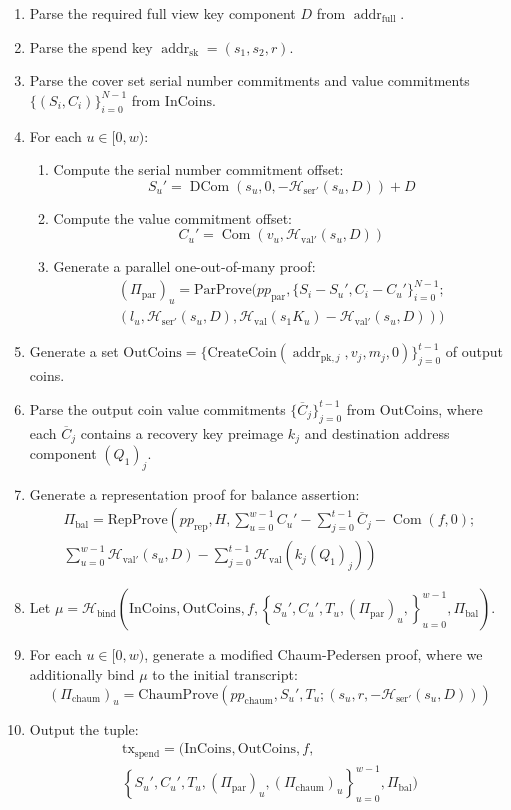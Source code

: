 \documentclass{llncs}
\newcommand{\hash}{\mathcal{H}}
\newcommand{\addr}{\operatorname{addr}}
\newcommand{\com}{\operatorname{Com}}
\newcommand{\dcom}{\operatorname{DCom}}
\begin{document}
\begin{enumerate}
    \item Parse the required full view key component $D$ from $\addr_{\text{full}}$.
    \item Parse the spend key $\addr_{\text{sk}} = (s_1, s_2, r)$.
    \item Parse the cover set serial number commitments and value commitments $\{(S_i, C_i)\}_{i=0}^{N-1}$ from $\text{InCoins}$.
    \item For each $u \in [0,w)$:
    \begin{enumerate}
        \item Compute the serial number commitment offset: $$S_u' = \dcom(s_u, 0, -\hash_{\text{ser}'}(s_u, D)) + D$$
        \item Compute the value commitment offset: $$C_u' = \com(v_u, \hash_{\text{val}'}(s_u, D))$$
        \item Generate a parallel one-out-of-many proof:
        \begin{multline*}
        (\Pi_{\text{par}})_u = \text{ParProve}(pp_{\text{par}},\{S_i - S_u', C_i - C_u'\}_{i=0}^{N-1}; \\
        (l_u, \hash_{\text{ser}'}(s_u, D), \hash_{\text{val}}(s_1 K_u) - \hash_{\text{val}'}(s_u, D)))
        \end{multline*}
    \end{enumerate}
    \item Generate a set $\text{OutCoins} = \{\text{CreateCoin}(\addr_{\text{pk},j}, v_j, m_j, 0)\}_{j=0}^{t-1}$ of output coins.
    \item Parse the output coin value commitments $\{\overline{C}_j\}_{j=0}^{t-1}$ from $\text{OutCoins}$, where each $\overline{C}_j$ contains a recovery key preimage $k_j$ and destination address component $(Q_1)_j$.
    \item Generate a representation proof for balance assertion:
    \begin{multline*}
    \Pi_{\text{bal}} = \text{RepProve}\left( pp_{\text{rep}}, H, \sum_{u=0}^{w-1} C_u' - \sum_{j=0}^{t-1} \overline{C}_j - \com(f,0); \right. \\
    \left. \sum_{u=0}^{w-1} \hash_{\text{val}'}(s_u,D) - \sum_{j=0}^{t-1} \hash_{\text{val}}(k_j(Q_1)_j) \right)
    \end{multline*}
    \item Let $\mu = \hash_{\text{bind}}( \text{InCoins}, \text{OutCoins}, f, \left\{ S_u', C_u', T_u, (\Pi_{\text{par}})_u, \right\}_{u=0}^{w-1}, \Pi_{\text{bal}} )$.
    \item For each $u \in [0,w)$, generate a modified Chaum-Pedersen proof, where we additionally bind $\mu$ to the initial transcript: $$(\Pi_{\text{chaum}})_u = \text{ChaumProve}(pp_{\text{chaum}},S_u', T_u; (s_u, r, -\hash_{\text{ser}'}(s_u, D)))$$
    \item Output the tuple:
    \begin{multline*}
    \text{tx}_{\text{spend}} = ( \text{InCoins}, \text{OutCoins}, f, \\
    \left\{ S_u', C_u', T_u, (\Pi_{\text{par}})_u, (\Pi_{\text{chaum}})_u \right\}_{u=0}^{w-1}, \Pi_{\text{bal}} )
    \end{multline*}
\end{enumerate}
\end{document}
